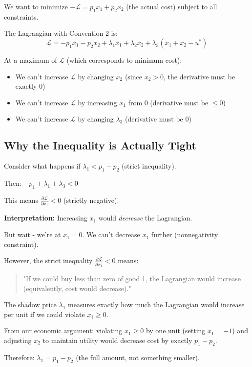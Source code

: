 \documentclass[11pt]{article}
\begin{document}
We want to minimize $-\mathcal{L} = p_1 x_1 + p_2 x_2$ (the actual cost) subject to all constraints.

The Lagrangian with Convention 2 is:
$$\mathcal{L} = -p_1 x_1 - p_2 x_2 + \lambda_1 x_1 + \lambda_2 x_2 + \lambda_3(x_1 + x_2 - u^*)$$

At a maximum of $\mathcal{L}$ (which corresponds to minimum cost):
\begin{itemize}
\item We can't increase $\mathcal{L}$ by changing $x_2$ (since $x_2 > 0$, the derivative must be exactly 0)
\item We can't increase $\mathcal{L}$ by increasing $x_1$ from 0 (derivative must be $\leq 0$)
\item We can't increase $\mathcal{L}$ by changing $\lambda_3$ (derivative must be 0)
\end{itemize}

\subsection{Why the Inequality is Actually Tight}

Consider what happens if $\lambda_1 < p_1 - p_2$ (strict inequality).

Then: $-p_1 + \lambda_1 + \lambda_3 < 0$

This means $\frac{\partial \mathcal{L}}{\partial x_1} < 0$ (strictly negative).

\textbf{Interpretation:} Increasing $x_1$ would \textit{decrease} the Lagrangian.

But wait - we're at $x_1 = 0$. We can't decrease $x_1$ further (nonnegativity constraint).

However, the strict inequality $\frac{\partial \mathcal{L}}{\partial x_1} < 0$ means:
\begin{quote}
"If we could buy less than zero of good 1, the Lagrangian would increase (equivalently, cost would decrease)."
\end{quote}

The shadow price $\lambda_1$ measures exactly how much the Lagrangian would increase per unit if we could violate $x_1 \geq 0$.

From our economic argument: violating $x_1 \geq 0$ by one unit (setting $x_1 = -1$) and adjusting $x_2$ to maintain utility would decrease cost by exactly $p_1 - p_2$.

Therefore: $\lambda_1 = p_1 - p_2$ (the full amount, not something smaller).
\end{document}
